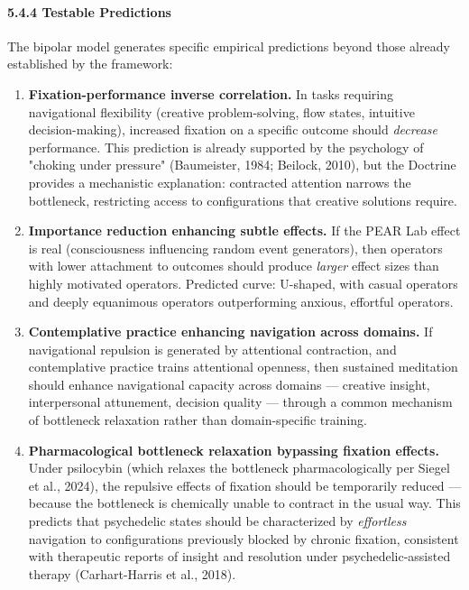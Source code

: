 \paragraph*{5.4.4 Testable Predictions}


The bipolar model generates specific empirical predictions beyond those already established by the framework:


\begin{enumerate}[nosep,leftmargin=*]
  \item \textbf{Fixation-performance inverse correlation.} In tasks requiring navigational flexibility (creative problem-solving, flow states, intuitive decision-making), increased fixation on a specific outcome should \textit{decrease} performance. This prediction is already supported by the psychology of "choking under pressure" (Baumeister, 1984; Beilock, 2010), but the Doctrine provides a mechanistic explanation: contracted attention narrows the bottleneck, restricting access to configurations that creative solutions require.
  \item \textbf{Importance reduction enhancing subtle effects.} If the PEAR Lab effect is real (consciousness influencing random event generators), then operators with lower attachment to outcomes should produce \textit{larger} effect sizes than highly motivated operators. Predicted curve: U-shaped, with casual operators and deeply equanimous operators outperforming anxious, effortful operators.
  \item \textbf{Contemplative practice enhancing navigation across domains.} If navigational repulsion is generated by attentional contraction, and contemplative practice trains attentional openness, then sustained meditation should enhance navigational capacity across domains — creative insight, interpersonal attunement, decision quality — through a common mechanism of bottleneck relaxation rather than domain-specific training.
  \item \textbf{Pharmacological bottleneck relaxation bypassing fixation effects.} Under psilocybin (which relaxes the bottleneck pharmacologically per Siegel et al., 2024), the repulsive effects of fixation should be temporarily reduced — because the bottleneck is chemically unable to contract in the usual way. This predicts that psychedelic states should be characterized by \textit{effortless} navigation to configurations previously blocked by chronic fixation, consistent with therapeutic reports of insight and resolution under psychedelic-assisted therapy (Carhart-Harris et al., 2018).
\end{enumerate}


